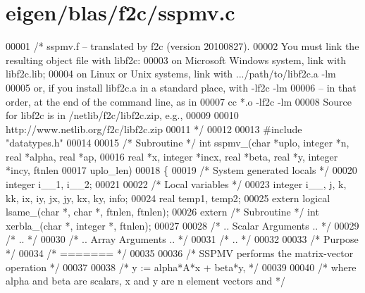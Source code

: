 \hypertarget{eigen_2blas_2f2c_2sspmv_8c_source}{}\section{eigen/blas/f2c/sspmv.c}
\label{eigen_2blas_2f2c_2sspmv_8c_source}

\begin{DoxyCode}
00001 \textcolor{comment}{/* sspmv.f -- translated by f2c (version 20100827).}
00002 \textcolor{comment}{   You must link the resulting object file with libf2c:}
00003 \textcolor{comment}{    on Microsoft Windows system, link with libf2c.lib;}
00004 \textcolor{comment}{    on Linux or Unix systems, link with .../path/to/libf2c.a -lm}
00005 \textcolor{comment}{    or, if you install libf2c.a in a standard place, with -lf2c -lm}
00006 \textcolor{comment}{    -- in that order, at the end of the command line, as in}
00007 \textcolor{comment}{        cc *.o -lf2c -lm}
00008 \textcolor{comment}{    Source for libf2c is in /netlib/f2c/libf2c.zip, e.g.,}
00009 \textcolor{comment}{}
00010 \textcolor{comment}{        http://www.netlib.org/f2c/libf2c.zip}
00011 \textcolor{comment}{*/}
00012 
00013 \textcolor{preprocessor}{#include "datatypes.h"}
00014 
00015 \textcolor{comment}{/* Subroutine */} \textcolor{keywordtype}{int} sspmv\_(\textcolor{keywordtype}{char} *uplo, integer *n, real *alpha, real *ap, 
00016     real *x, integer *incx, real *beta, real *y, integer *incy, ftnlen 
00017     uplo\_len)
00018 \{
00019     \textcolor{comment}{/* System generated locals */}
00020     integer i\_\_1, i\_\_2;
00021 
00022     \textcolor{comment}{/* Local variables */}
00023     integer i\_\_, j, k, kk, ix, iy, jx, jy, kx, ky, info;
00024     real temp1, temp2;
00025     \textcolor{keyword}{extern} logical lsame\_(\textcolor{keywordtype}{char} *, \textcolor{keywordtype}{char} *, ftnlen, ftnlen);
00026     \textcolor{keyword}{extern} \textcolor{comment}{/* Subroutine */} \textcolor{keywordtype}{int} xerbla\_(\textcolor{keywordtype}{char} *, integer *, ftnlen);
00027 
00028 \textcolor{comment}{/*     .. Scalar Arguments .. */}
00029 \textcolor{comment}{/*     .. */}
00030 \textcolor{comment}{/*     .. Array Arguments .. */}
00031 \textcolor{comment}{/*     .. */}
00032 
00033 \textcolor{comment}{/*  Purpose */}
00034 \textcolor{comment}{/*  ======= */}
00035 
00036 \textcolor{comment}{/*  SSPMV  performs the matrix-vector operation */}
00037 
00038 \textcolor{comment}{/*     y := alpha*A*x + beta*y, */}
00039 
00040 \textcolor{comment}{/*  where alpha and beta are scalars, x and y are n element vectors and */}

\end{DoxyCode}
